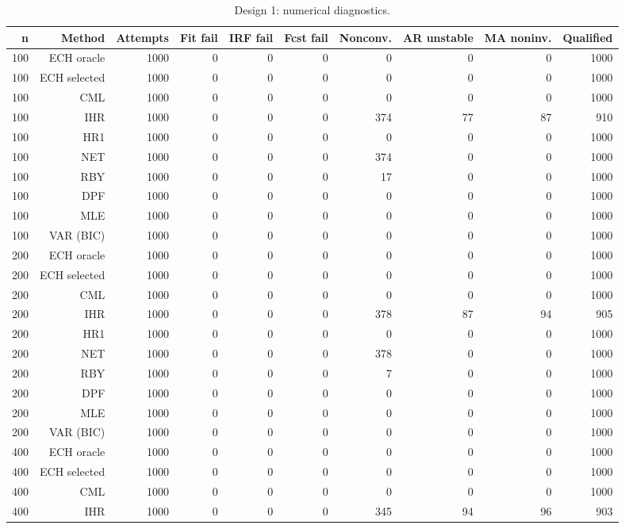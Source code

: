 \begin{table}[p]\centering
\caption{Design 1: numerical diagnostics.}
\small
\begin{tabular}{rrrrrrrrrr}\toprule
n & Method & Attempts & Fit fail & IRF fail & Fcst fail & Nonconv. & AR unstable & MA noninv. & Qualified \\\midrule
100 & ECH oracle & 1000 & 0 & 0 & 0 &   0 &  0 &  0 & 1000 \\
100 & ECH selected & 1000 & 0 & 0 & 0 &   0 &  0 &  0 & 1000 \\
100 & CML & 1000 & 0 & 0 & 0 &   0 &  0 &  0 & 1000 \\
100 & IHR & 1000 & 0 & 0 & 0 & 374 & 77 & 87 &  910 \\
100 & HR1 & 1000 & 0 & 0 & 0 &   0 &  0 &  0 & 1000 \\
100 & NET & 1000 & 0 & 0 & 0 & 374 &  0 &  0 & 1000 \\
100 & RBY & 1000 & 0 & 0 & 0 &  17 &  0 &  0 & 1000 \\
100 & DPF & 1000 & 0 & 0 & 0 &   0 &  0 &  0 & 1000 \\
100 & MLE & 1000 & 0 & 0 & 0 &   0 &  0 &  0 & 1000 \\
100 & VAR (BIC) & 1000 & 0 & 0 & 0 &   0 &  0 &  0 & 1000 \\
200 & ECH oracle & 1000 & 0 & 0 & 0 &   0 &  0 &  0 & 1000 \\
200 & ECH selected & 1000 & 0 & 0 & 0 &   0 &  0 &  0 & 1000 \\
200 & CML & 1000 & 0 & 0 & 0 &   0 &  0 &  0 & 1000 \\
200 & IHR & 1000 & 0 & 0 & 0 & 378 & 87 & 94 &  905 \\
200 & HR1 & 1000 & 0 & 0 & 0 &   0 &  0 &  0 & 1000 \\
200 & NET & 1000 & 0 & 0 & 0 & 378 &  0 &  0 & 1000 \\
200 & RBY & 1000 & 0 & 0 & 0 &   7 &  0 &  0 & 1000 \\
200 & DPF & 1000 & 0 & 0 & 0 &   0 &  0 &  0 & 1000 \\
200 & MLE & 1000 & 0 & 0 & 0 &   0 &  0 &  0 & 1000 \\
200 & VAR (BIC) & 1000 & 0 & 0 & 0 &   0 &  0 &  0 & 1000 \\
400 & ECH oracle & 1000 & 0 & 0 & 0 &   0 &  0 &  0 & 1000 \\
400 & ECH selected & 1000 & 0 & 0 & 0 &   0 &  0 &  0 & 1000 \\
400 & CML & 1000 & 0 & 0 & 0 &   0 &  0 &  0 & 1000 \\
400 & IHR & 1000 & 0 & 0 & 0 & 345 & 94 & 96 &  903 \\

\end{tabular}
\end{table}
